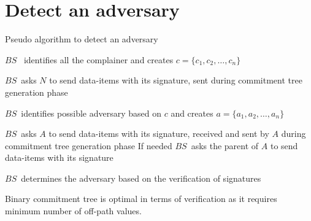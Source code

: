 \section{Detect an adversary}
\begin{algorithm}
\caption{Pseudo algorithm to detect an adversary}

	\begin{algorithmic}[1]

			\STATE $BS$ \ identifies all the complainer and creates $c = \{c_{1}, c_{2}, \dotsc, c_{n}\}$

				\STATE $BS$\ asks $N$ to send data-items with its signature, sent during commitment tree generation phase
			
			\ENDFOR

			\STATE $BS$\ identifies possible adversary based on $c$ and creates $a = \{a_{1},a_{2},\dotsc,a_{n}\}$


				\STATE $BS$\ asks $A$ to send data-items with its signature, received and sent by $A$ during commitment tree generation phase
				\STATE If needed $BS$\  asks the parent of $A$ to send data-items with its signature
	
			\ENDFOR

			\STATE $BS$\ determines the adversary based on the verification of signatures

	\end{algorithmic}
\end{algorithm}

\begin{theorem}
	\label{Commitment tree}
	Binary commitment tree is optimal in terms of verification as it requires minimum number of off-path values.
\end{theorem}

